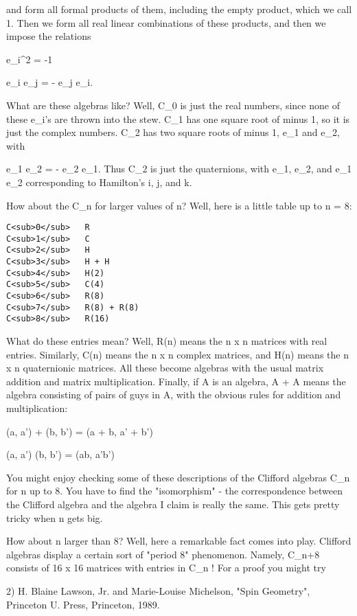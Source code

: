 and form all formal products of them, including the empty product, which
we call 1.  Then we form all real linear combinations of these products,
and then we impose the relations

e_{i}^{2} = -1

e_{i} e_{j} = - e_{j} e_{i}.

What are these algebras like?  Well, C_{0} 
is just the real numbers, since
none of these e_{i}'s are thrown into the stew.  C_{1} 
has one square root of minus 1, so it is just the complex numbers.  
C_{2} has two square roots of minus 1, e_{1} and e_{2},
with 

e_{1} e_{2} = - e_{2} e_{1}.
Thus C_{2} is just the quaternions, with 
e_{1}, e_{2}, and e_{1} e_{2} corresponding
to Hamilton's i, j, and k.  

How about the C_{n} for larger values of n?  
Well, here is a little table up to n = 8:
\begin{verbatim}
C<sub>0</sub>   R
C<sub>1</sub>   C
C<sub>2</sub>   H
C<sub>3</sub>   H + H
C<sub>4</sub>   H(2) 
C<sub>5</sub>   C(4)
C<sub>6</sub>   R(8)
C<sub>7</sub>   R(8) + R(8)
C<sub>8</sub>   R(16)
\end{verbatim}
    
What do these entries mean?  Well, R(n) means the n x n matrices with
real entries.  Similarly, C(n) means the n x n complex matrices, and
H(n) means the n x n quaternionic matrices.  All these become algebras
with the usual matrix addition and matrix multiplication.  Finally, if A
is an algebra, A + A means the algebra consisting of pairs of guys in A,
with the obvious rules for addition and multiplication:

(a, a') + (b, b') = (a + b, a' + b')

(a, a') (b, b') = (ab, a'b')

You might enjoy checking some of these descriptions of the Clifford
algebras C_{n} for n up to 8.  You have to find the 
"isomorphism" - the
correspondence between the Clifford algebra and the algebra I claim is
really the same.  This gets pretty tricky when n gets big.  

How about n larger than 8?  Well, here a remarkable fact comes into
play.  Clifford algebras display a certain sort of "period 8"
phenomenon.  Namely, C_{n+8} consists of 16 x 16 matrices with entries
in C_{n} !   For a proof you might try 

2) H. Blaine Lawson, Jr. and Marie-Louise Michelson, "Spin Geometry",
Princeton U. Press, Princeton, 1989.

